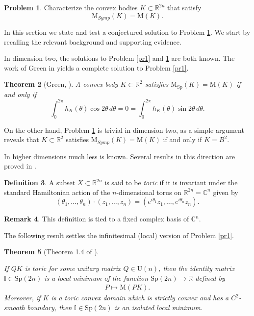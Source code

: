 \documentclass[12pt]{amsart}
\newtheorem{theorem}{Theorem}[section]
\theoremstyle{definition}
\newtheorem{remark}[theorem]{Remark}
\newtheorem{problem}[theorem]{Problem}
\newtheorem{definition}[theorem]{Definition}
\newcommand{\II}{{\mathbb I}}
\newcommand{\CC}{{\mathbb C}}
\newcommand{\RR}{{\mathbb R}}
\newcommand{\mw}{{{\mathrm {M}}}}
\newcommand{\lmw}{{\mathrm {M}}_{\mathrm{Sp}}}
\newcommand{\nlmw}{\mathrm{M}_{{Symp}}}
\begin{document}
\begin{problem}\label{pr2}
Characterize the convex bodies $K \subset \RR^{2n}$ that satisfy \begin{equation}\label{nonlin}\nlmw(K) = \mw(K).\end{equation}
\end{problem}


In this section  we state and test a conjectured solution to Problem \ref{pr2}. We start by recalling the relevant background and supporting evidence. 

In dimension two, the solutions to Problem \ref{pr1} and \ref{pr2} are both known. The work of Green in \cite{green} yields a complete solution to Problem \ref{pr1}.
\begin{theorem}[Green, \cite{green}]\label{green}
A convex body $K \subset \RR^2$ satisfies $\lmw(K) = \mw(K)$
if and only if $$\int_0^{2\pi} h_{K}(\theta)\cos 2 \theta \, d \theta =0=\int_0^{2\pi} h_{K}(\theta)\sin  2 \theta \, d \theta.$$
\end{theorem}
\noindent On the other hand, Problem \ref{pr2} is trivial in dimension two, as a simple argument reveals that $K \subset \RR^2$ satisfies $\nlmw(K) = \mw(K)$ if and only if $K= B^2$. 


In higher dimensions much less is known. Several results in this direction are proved in \cite{ak}. 
\begin{definition} A subset $X \subset \RR^{2n}$ is said to be {\em toric} if it is invariant under the standard Hamiltonian action of the $n$-dimensional torus on $\RR^{2n} =\CC^n$ given by
$$(\theta_1, \dots, \theta_n) \cdot (z_1, \dots,z_n) = \left(e^{i\theta_1}z_1, \dots, e^{i \theta_n} z_n\right).$$
\end{definition}

\begin{remark}\label{complex}
This definition is tied to a fixed complex basis of $\CC^n$.
\end{remark}


The following result settles the infinitesimal (local) version of  Problem \ref{pr1}. 

\begin{theorem}[Theorem 1.4 of \cite{ak}]\label{toric}

If $QK$ is toric for some unitary matrix $Q \in \mathrm{U}(n)$, then the identity matrix  $\II \in \mathrm{Sp}(2n)$ is a local minimum of the function $\mathrm{Sp}(2n) \to \RR$ defined by 
\begin{align*}
 P \mapsto \mw(PK).
\end{align*}
Moreover, if $K$ is a toric convex domain which is strictly convex and has a $C^2$-smooth boundary, then $\II \in \mathrm{Sp}(2n)$ is an isolated local minimum.
 
\end{theorem}
\end{document}
